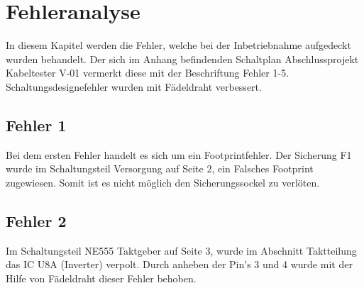\documentclass[a4paper,11pt]{scrartcl}
\begin{document}
\section{Fehleranalyse}

\begin{center}
In diesem Kapitel werden die Fehler, welche bei der Inbetriebnahme aufgedeckt wurden behandelt. Der sich im Anhang befindenden Schaltplan \glqq Abschlussprojekt Kabeltester  V-01\grqq{} vermerkt diese mit der Beschriftung \glqq Fehler 1-5\grqq{}. Schaltungsdesignefehler wurden mit Fädeldraht verbessert.  
\end{center}


\subsection{Fehler 1}

Bei dem ersten Fehler handelt es sich um ein Footprintfehler. Der Sicherung F1 wurde im Schaltungsteil \glqq Versorgung \grqq{} auf Seite 2, ein Falsches Footprint zugewiesen. Somit ist es nicht möglich den Sicherungssockel zu verlöten. 


\subsection{Fehler 2}

Im Schaltungsteil \glqq NE555 Taktgeber \grqq{} auf Seite 3, wurde im Abschnitt \glqq Taktteilung \grqq{} das IC U8A (Inverter) verpolt. Durch anheben der Pin's 3 und 4 wurde mit der Hilfe von Fädeldraht dieser Fehler behoben.

\end{document}
